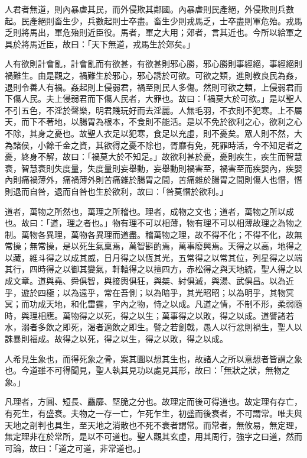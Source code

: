 \begin{pinyinscope}
人君者無道，則內暴虐其民，而外侵欺其鄰國。內暴虐則民產絕，外侵欺則兵數起。民產絕則畜生少，兵數起則士卒盡。畜生少則戎馬乏，士卒盡則軍危殆。戎馬乏則將馬出，軍危殆則近臣役。馬者，軍之大用；郊者，言其近也。今所以給軍之具於將馬近臣，故曰：「天下無道，戎馬生於郊矣。」

人有欲則計會亂，計會亂而有欲甚，有欲甚則邪心勝，邪心勝則事經絕，事經絕則禍難生。由是觀之，禍難生於邪心，邪心誘於可欲。可欲之類，進則教良民為姦，退則令善人有禍。姦起則上侵弱君，禍至則民人多傷。然則可欲之類，上侵弱君而下傷人民。夫上侵弱君而下傷人民者，大罪也。故曰：「禍莫大於可欲。」是以聖人不引五色，不淫於聲樂，明君賤玩好而去淫麗。人無毛羽，不衣則不犯寒。上不屬天，而下不著地，以腸胃為根本，不食則不能活。是以不免於欲利之心，欲利之心不除，其身之憂也。故聖人衣足以犯寒，食足以充虛，則不憂矣。眾人則不然，大為諸侯，小餘千金之資，其欲得之憂不除也，胥靡有免，死罪時活，今不知足者之憂，終身不解，故曰：「禍莫大於不知足。」故欲利甚於憂，憂則疾生，疾生而智慧衰，智慧衰則失度量，失度量則妄舉動，妄舉動則禍害至，禍害至而疾嬰內，疾嬰內則痛禍薄外，痛禍薄外則苦痛雜於腸胃之間，苦痛雜於腸胃之間則傷人也憯，憯則退而自咎，退而自咎也生於欲利，故曰：「咎莫憯於欲利。」

道者，萬物之所然也，萬理之所稽也。理者，成物之文也；道者，萬物之所以成也。故曰：「道，理之者也。」物有理不可以相薄，物有理不可以相薄故理之為物之制。萬物各異理，萬物各異理而道盡。稽萬物之理，故不得不化；不得不化，故無常操；無常操，是以死生氣稟焉，萬智斟酌焉，萬事廢興焉。天得之以高，地得之以藏，維斗得之以成其威，日月得之以恆其光，五常得之以常其位，列星得之以端其行，四時得之以御其變氣，軒轅得之以擅四方，赤松得之與天地統，聖人得之以成文章。道與堯、舜俱智，與接輿俱狂，與桀、紂俱滅，與湯、武俱昌。以為近乎，遊於四極；以為遠乎，常在吾側；以為暗乎，其光昭昭；以為明乎，其物冥冥；而功成天地，和化雷霆，宇內之物，恃之以成。凡道之情，不制不形，柔弱隨時，與理相應。萬物得之以死，得之以生；萬事得之以敗，得之以成。道譬諸若水，溺者多飲之即死，渴者適飲之即生。譬之若劍戟，愚人以行忿則禍生，聖人以誅暴則福成。故得之以死，得之以生，得之以敗，得之以成。

人希見生象也，而得死象之骨，案其圖以想其生也，故諸人之所以意想者皆謂之象也。今道雖不可得聞見，聖人執其見功以處見其形，故曰：「無狀之狀，無物之象。」

凡理者，方圓、短長、麤靡、堅脆之分也。故理定而後可得道也。故定理有存亡，有死生，有盛衰。夫物之一存一亡，乍死乍生，初盛而後衰者，不可謂常。唯夫與天地之剖判也具生，至天地之消散也不死不衰者謂常。而常者，無攸易，無定理，無定理非在於常所，是以不可道也。聖人觀其玄虛，用其周行，強字之曰道，然而可論，故曰：「道之可道，非常道也。」


\end{pinyinscope}
